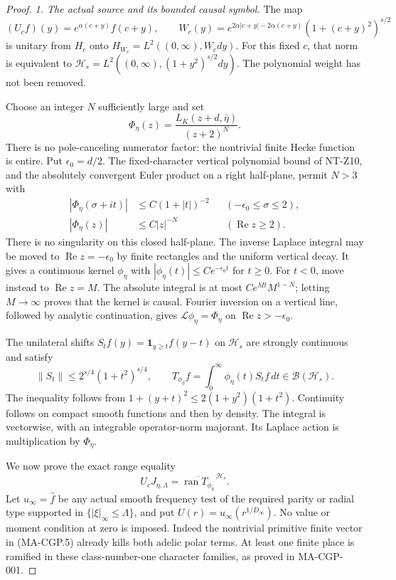 \begin{proof}
\emph{1. The actual source and its bounded causal symbol.}
The map
\[
 (U_cf)(y)=e^{\alpha(c+y)}f(c+y),\qquad
 W_c(y)=e^{2\alpha|c+y|-2\alpha(c+y)}
                                      (1+(c+y)^2)^{s/2}
 \tag{MA-GW.54}
\]
is unitary from \(H_c\) onto \(H_{W_c}=L^2((0,\infty),W_cdy)\).
For this fixed \(c\), that norm is equivalent to
\(\mathcal H_s=L^2((0,\infty),(1+y^2)^{s/2}dy)\).
The polynomial weight has not been removed.

Choose an integer \(N\) sufficiently large and set
\[
              \Phi_\eta(z)=
                 \frac{L_K(z+d,\bar\eta)}{(z+2)^N}.
 \tag{MA-GW.55}
\]
There is no pole-canceling numerator factor: the nontrivial
finite Hecke function is entire.  Put \(\epsilon_0=d/2\).
The fixed-character vertical polynomial bound of NT-Z10,
and the absolutely convergent Euler product on a right
half-plane, permit \(N>3\) with
\[
 \begin{aligned}
 |\Phi_\eta(\sigma+it)|&\le C(1+|t|)^{-2}
                  &&(-\epsilon_0\le\sigma\le2),\\
 |\Phi_\eta(z)|&\le C|z|^{-N}
                  &&(\operatorname{Re}z\ge2).
 \end{aligned}
 \tag{MA-GW.56}
\]
There is no singularity on this closed half-plane.
The inverse Laplace integral may be moved to
\(\operatorname{Re}z=-\epsilon_0\) by finite rectangles
and the uniform vertical decay.  It gives a continuous
kernel \(\phi_\eta\) with
\(|\phi_\eta(t)|\le Ce^{-\epsilon_0t}\) for \(t\ge0\).
For \(t<0\), move instead to \(\operatorname{Re}z=M\).
The absolute integral is at most \(Ce^{Mt}M^{1-N}\);
letting \(M\to\infty\) proves that the kernel is causal.
Fourier inversion on a vertical line, followed by analytic
continuation, gives \(\mathcal L\phi_\eta=\Phi_\eta\) on
\(\operatorname{Re}z>-\epsilon_0\).

The unilateral shifts \(S_tf(y)=\mathbf1_{y\ge t}f(y-t)\)
on \(\mathcal H_s\) are strongly continuous and satisfy
\[
 \|S_t\|\le2^{s/4}(1+t^2)^{s/4},\qquad
 T_{\phi_\eta}f=\int_0^\infty\phi_\eta(t)S_tf\,dt
                                      \in\mathcal B(\mathcal H_s).
 \tag{MA-GW.57}
\]
The inequality follows from
\(1+(y+t)^2\le2(1+y^2)(1+t^2)\).
Continuity follows on compact smooth functions and then
by density.  The integral is vectorwise, with an integrable
operator-norm majorant.  Its Laplace action is multiplication
by \(\Phi_\eta\).

We now prove the exact range equality
\[
 U_cJ_{\eta,\Lambda}
        =\overline{\operatorname{ran}T_{\phi_\eta}}^{\,\mathcal H_s}.
 \tag{MA-GW.58}
\]
Let \(u_\infty=\widehat f\) be any actual smooth frequency
test of the required parity or radial type supported in
\(\{|\xi|_\infty\le\Lambda\}\), and put
\(U(r)=u_\infty(r^{1/D_\infty})\).
No value or moment condition at zero is imposed.
Indeed the nontrivial primitive finite vector in
(MA-CGP.5) already kills both adelic polar terms.
At least one finite place is ramified in these
class-number-one character families, as proved in
MA-CGP-001.


\end{proof}

